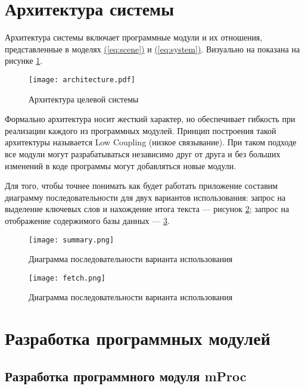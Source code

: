 \section{Архитектура системы}

Архитектура системы включает программные модули и их отношения, представленные в моделях \hyperref[eq:scene]{(\ref{eq:scene})} и \hyperref[eq:system]{(\ref{eq:system})}. Визуально на показана на рисунке \hyperref[fig:arch]{\ref{fig:arch}}.

\begin{figure}[H]
\centering
\texttt{[image: architecture.pdf]}
\caption{Архитектура целевой системы}
\label{fig:arch}
\end{figure}

Формально архитектура носит жесткий характер, но обеспечивает гибкость при реализации каждого из программных модулей. Принцип построения такой архитектуры называется Low Coupling (низкое связывание). При таком подходе все модули могут разрабатываться независимо друг от друга и без больших изменений в коде программы могут добавляться новые модули.

Для того, чтобы точнее понимать как будет работать приложение составим диаграмму последовательности для двух вариантов использования: запрос на выделение ключевых слов и нахождение итога текста --- рисунок \hyperref[fig:extract]{\ref{fig:extract}}; запрос на отображение содержимого базы данных --- \hyperref[fig:fetch]{\ref{fig:fetch}}.

\begin{figure}[H]
\centering
\texttt{[image: summary.png]}
\caption{Диаграмма последовательности варианта использования }
\label{fig:extract}
\end{figure}

\begin{figure}[H]
\centering
\texttt{[image: fetch.png]}
\caption{Диаграмма последовательности варианта использования }
\label{fig:fetch}
\end{figure}

\section{Разработка программных модулей}

\subsection{Разработка программного модуля mProc}

